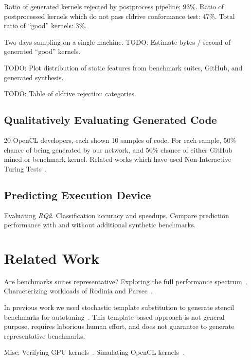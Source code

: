 \documentclass[preprint,nonatbib,10pt,nocopyrightspace]{sigplanconf}
\begin{document}
Ratio of generated kernels rejected by postprocess pipeline:
93\%. Ratio of postprocessed kernels which do not pass cldrive
conformance test:
47\%. Total ratio of ``good'' kernels: 3\%.

Two days sampling on a single machine. TODO: Estimate bytes / second
of generated ``good'' kernels.

TODO: Plot distribution of static features from benchmark suites,
GitHub, and generated synthesis.

TODO: Table of cldrive rejection categories.


\subsection{Qualitatively Evaluating Generated Code}\label{subsec:}

20 OpenCL developers, each shown 10 samples of code. For each sample,
50\% chance of being generated by our network, and 50\% chance of
either GitHub mined or benchmark kernel. Related works which have used
Non-Interactive Turing Tests~\cite{Gao2015a,Zhang2016}.


\subsection{Predicting Execution Device}\label{subsec:}

Evaluating \emph{RQ2}. Classification accuracy and speedups. Compare
prediction performance with and without additional synthetic
benchmarks.


\section{Related Work}\label{sec:related-work}

Are benchmarks suites representative? Exploring the full performance
spectrum~\cite{Ryoo2015}. Characterizing workloads of Rodinia and
Parsec~\cite{Che2010}.

In previous work we used stochastic template substitution to generate
stencil benchmarks for autotuning~\cite{Cummins2015a}. This template
based approach is not general purpose, requires laborious human
effort, and does not guarantee to generate representative benchmarks.

Misc: Verifying GPU kernels~\cite{Betts2012}. Simulating OpenCL
kernels~\cite{Price2015}.
\end{document}
